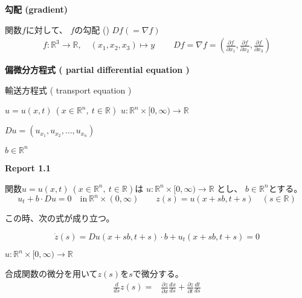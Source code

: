\documentclass[12pt,b5paper]{ltjsarticle}
\begin{document}
\hrulefill


\textbf{勾配 (gradient)}

関数$f$に対して、
$f$の勾配 ()
$Df(=\nabla f)$
\begin{gather}
 f:\mathbb{R}^3 \to \mathbb{R},
  \quad
 (x_1,x_2,x_3)\mapsto y \qquad\
 Df = \nabla f = \left(
  \frac{\partial f}{\partial x_1},
  \frac{\partial f}{\partial x_2},
  \frac{\partial f}{\partial x_3}
  \right)
\end{gather}


\hrulefill


\textbf{偏微分方程式 ( partial differential equation )}

輸送方程式 ( transport equation )

\hrulefill

$u=u(x,t)\ (x\in\mathbb{R}^n,\ t\in\mathbb{R})$
$u: \mathbb{R}^n\times [ 0, \infty ) \to \mathbb{R}$

$Du=(u_{x_{1}},u_{x_{2}},\dots,u_{x_{n}})$

$b\in\mathbb{R}^n$




\hrulefill

\textbf{Report 1.1}

関数$u=u(x,t)\ (x\in\mathbb{R}^n,\ t\in\mathbb{R})$は
$u: \mathbb{R}^n\times [ 0, \infty ) \to \mathbb{R}$
とし、
$b\in\mathbb{R}^n$とする。
\begin{equation}
 u_{t} + b \cdot Du = 0
  \quad
  \text{in}\
 \mathbb{R}^{n} \times (0,\infty)
 \qquad
 z(s) = u(x+sb,t+s)
 \quad
 (s\in\mathbb{R})
 \label{eq001}
\end{equation}


この時、次の式が成り立つ。

\begin{equation}
 \dot{z}(s) = Du(x+sb, t+s)\cdot b + u_{t}(x+sb,t+s) =0
\end{equation}



\dotfill

$u:\mathbb{R}^{n}\times [0,\infty)\to\mathbb{R}$

合成関数の微分を用いて$z(s)$を$s$で微分する。
\begin{align}
 \frac{d}{d s}z(s)
  =& \frac{\partial z}{\partial x}\frac{d x}{d s}
   + \frac{\partial z}{\partial t}\frac{d t}{d s}\\
\end{align}
\end{document}
